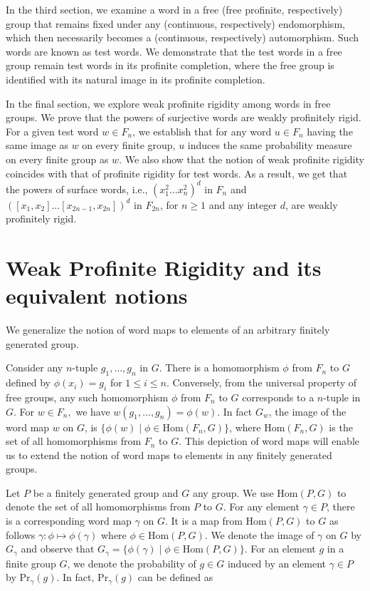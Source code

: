 \documentclass[12pt]{amsart}
\begin{document}
In the third section, we examine a word in a free (free profinite, respectively) group that remains fixed under any (continuous, respectively) endomorphism, which then necessarily becomes a (continuous, respectively) automorphism. Such words are known as test words. We demonstrate that the test words in a free group remain test words in its profinite completion, where the free group is identified with its natural image in its profinite completion.

In the final section, we explore weak profinite rigidity among words in free groups. We prove that the powers of surjective words are weakly profinitely rigid. For a given test word $w \in F_n$, we establish that for any word $u \in F_n$ having the same image as $w$ on every finite group, $u$ induces the same probability measure on every finite group as $w$. We also show that the notion of weak profinite rigidity coincides with that of profinite rigidity for test words. As a result, we get that the powers of surface words,  i.e., $(x_1^2\ldots x_n^2)^d$ in $F_n$ and $([x_1,x_2]\ldots [x_{2n-1},x_{2n}])^d$ in $F_{2n}$, for $n \geq 1$ and any integer $d$, are weakly profinitely rigid.

\section{Weak Profinite Rigidity and its equivalent notions}

We generalize the notion of word maps to elements of an arbitrary finitely generated group.

Consider any $n$-tuple $g_1, \ldots,g_n$ in $G$. There is a homomorphism $\phi$ from $F_n$ to $G$ defined by $\phi(x_i) = g_i$ for $1 \leq i \leq n$. Conversely, from the universal property of free groups, any such homomorphism $\phi$ from $F_n$ to $G$ corresponds to a $n$-tuple in $G$. For $w \in F_n,$ we have $w(g_1,\ldots,g_n) = \phi(w).$ In fact $G_w$, the image of the word map $w$ on $G$, is $ \{ \phi(w) \mid \phi \in \mathrm{Hom}(F_n, G)\}$, where $\mathrm{Hom}(F_n,G)$ is the set of all homomorphisms from $F_n$ to $G$. This depiction of word maps will enable us to extend the notion of word maps to elements in any finitely generated groups.

Let $P$ be a finitely generated group and $G$ any group. We use $\mathrm{Hom}(P,G)$ to denote the set of all homomorphisms from $P$ to $G$. For any element $\gamma \in P$, there is a corresponding word map $\gamma$ on $G$. It is a map from $\mathrm{Hom}(P,G)$ to $G$ as follows $\gamma: \phi \mapsto \phi(\gamma)$ where $\phi \in \mathrm{Hom}(P,G)$. We denote the image of $\gamma$ on $G$ by $G_{\gamma}$ and observe that $G_{\gamma} = \{ \phi(\gamma) \mid \phi \in \mathrm{Hom}(P,G)\}.$ For an element $g$ in a finite group $G$, we denote the probability of $g \in G$ induced by an element $\gamma \in P$ by $\mathrm{Pr}_{\gamma}(g)$. In fact, $\mathrm{Pr}_{\gamma}(g)$ can be defined as 
\end{document}
